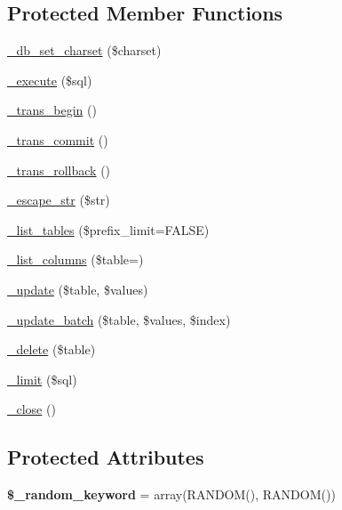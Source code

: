 \subsection*{Protected Member Functions}
\begin{DoxyCompactItemize}
\item 
\mbox{\hyperlink{class_c_i___d_b__postgre__driver_a5b337deca77525ef884c4629c18680a7}{\+\_\+db\+\_\+set\+\_\+charset}} (\$charset)
\item 
\mbox{\hyperlink{class_c_i___d_b__postgre__driver_ae728f2aec7808bb69eda61e7f83de199}{\+\_\+execute}} (\$sql)
\item 
\mbox{\hyperlink{class_c_i___d_b__postgre__driver_abef4ebd91949b1b902b10deba9c30733}{\+\_\+trans\+\_\+begin}} ()
\item 
\mbox{\hyperlink{class_c_i___d_b__postgre__driver_a25a6e55797a5b5966ac8ffc7ab3dfd74}{\+\_\+trans\+\_\+commit}} ()
\item 
\mbox{\hyperlink{class_c_i___d_b__postgre__driver_a10b258910feb3c8b636d66982fa7ef0e}{\+\_\+trans\+\_\+rollback}} ()
\item 
\mbox{\hyperlink{class_c_i___d_b__postgre__driver_a473b895b4bf1762fefd276d022ec8d2f}{\+\_\+escape\+\_\+str}} (\$str)
\item 
\mbox{\hyperlink{class_c_i___d_b__postgre__driver_a1eb267c295f87718c28932be2a54ace1}{\+\_\+list\+\_\+tables}} (\$prefix\+\_\+limit=F\+A\+L\+SE)
\item 
\mbox{\hyperlink{class_c_i___d_b__postgre__driver_a148657a92c450e0f62b47c45b9d82c12}{\+\_\+list\+\_\+columns}} (\$table=\textquotesingle{}\textquotesingle{})
\item 
\mbox{\hyperlink{class_c_i___d_b__postgre__driver_ad3d1303fdda6f5ec7d88356c124b921d}{\+\_\+update}} (\$table, \$values)
\item 
\mbox{\hyperlink{class_c_i___d_b__postgre__driver_a1a1392f7ccf7cec4209d2ac1d3918c79}{\+\_\+update\+\_\+batch}} (\$table, \$values, \$index)
\item 
\mbox{\hyperlink{class_c_i___d_b__postgre__driver_a7fa7cf323a1a590c1e6f6b9cf74665e6}{\+\_\+delete}} (\$table)
\item 
\mbox{\hyperlink{class_c_i___d_b__postgre__driver_a55c158b72500c2cd4afb2738d3a8de04}{\+\_\+limit}} (\$sql)
\item 
\mbox{\hyperlink{class_c_i___d_b__postgre__driver_aef6d453801af9f15243c7456d85119c0}{\+\_\+close}} ()
\end{DoxyCompactItemize}
\subsection*{Protected Attributes}
\begin{DoxyCompactItemize}
\item 
\mbox{\label{class_c_i___d_b__postgre__driver_ad9f4af987dcf8ff63472b86cc27d7e2c}} 
{\bfseries \$\+\_\+random\+\_\+keyword} = array(\textquotesingle{}R\+A\+N\+D\+OM()\textquotesingle{}, \textquotesingle{}R\+A\+N\+D\+OM()\textquotesingle{})
\end{DoxyCompactItemize}



